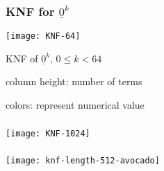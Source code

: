 \documentclass[handout,10pt]{ksbeamer}
\def\F#1{\underline{#1}}
\begin{document}
\begin{frame}
\frametitle{KNF for $\F{0}^{k}$}

\hspace*{2mm}
\texttt{[image: KNF-64]}
\vspace{8ex} 


KNF of $\F{0}^{k}$, $0 \leq k < 64$

column height: number of terms

colors: represent numerical value

\end{frame}

\begin{frame}
\frametitle{}

\hspace*{-15mm}
\texttt{[image: KNF-1024]}


\end{frame}


\begin{frame}
\frametitle{}

\begin{center}
 \texttt{[image: knf-length-512-avocado]}
\end{center}

\end{frame}






\end{document}
